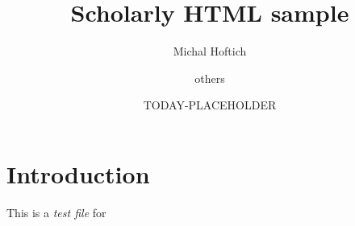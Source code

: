 \documentclass{article}
\title{Scholarly HTML sample}
\author{Michal Hoftich \and others}
\date{TODAY-PLACEHOLDER}
\begin{document}
\maketitle
\tableofcontents

\section{Introduction}

This is a \textit{test file} for \cite{scholarly}

\printbibliography
\end{document}
